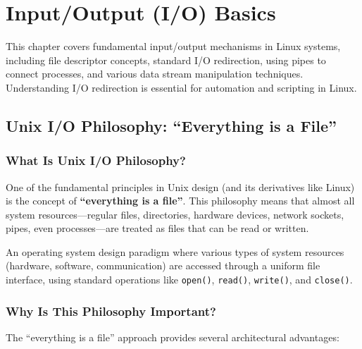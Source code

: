 
\chapter{Input/Output (I/O) Basics}
\label{ch:basic-io}

This chapter covers fundamental input/output mechanisms in Linux systems, including file descriptor concepts, standard I/O redirection, using pipes to connect processes, and various data stream manipulation techniques. Understanding I/O redirection is essential for automation and scripting in Linux.

\section{Unix I/O Philosophy: ``Everything is a File''}
\label{sec:unix-io-philosophy}

\subsection{What Is Unix I/O Philosophy?}

One of the fundamental principles in Unix design (and its derivatives like Linux) is the concept of \textbf{``everything is a file''}. This philosophy means that almost all system resources---regular files, directories, hardware devices, network sockets, pipes, even processes---are treated as files that can be read or written.

\begin{definition}
	An operating system design paradigm where various types of system resources (hardware, software, communication) are accessed through a uniform file interface, using standard operations like \texttt{open()}, \texttt{read()}, \texttt{write()}, and \texttt{close()}.
\end{definition}

\subsection{Why Is This Philosophy Important?}

The ``everything is a file'' approach provides several architectural advantages:

